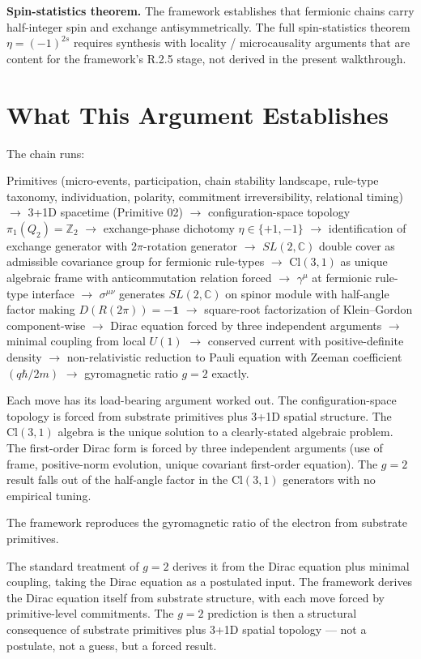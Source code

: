 \documentclass[11pt,a4paper]{article}
\begin{document}
\textbf{Spin-statistics theorem.} The framework establishes that fermionic chains carry half-integer spin and exchange antisymmetrically. The full spin-statistics theorem $\eta = (-1)^{2s}$ requires synthesis with locality / microcausality arguments that are content for the framework's R.2.5 stage, not derived in the present walkthrough.

\section{What This Argument Establishes}

The chain runs:

Primitives (micro-events, participation, chain stability landscape, rule-type taxonomy, individuation, polarity, commitment irreversibility, relational timing) $\to$ 3+1D spacetime (Primitive 02) $\to$ configuration-space topology $\pi_1(Q_2) = \mathbb{Z}_2$ $\to$ exchange-phase dichotomy $\eta \in \{+1, -1\}$ $\to$ identification of exchange generator with $2\pi$-rotation generator $\to$ $SL(2, \mathbb{C})$ double cover as admissible covariance group for fermionic rule-types $\to$ $\mathrm{Cl}(3,1)$ as unique algebraic frame with anticommutation relation forced $\to$ $\gamma^\mu$ at fermionic rule-type interface $\to$ $\sigma^{\mu\nu}$ generates $SL(2, \mathbb{C})$ on spinor module with half-angle factor making $D(R(2\pi)) = -\mathbf{1}$ $\to$ square-root factorization of Klein--Gordon component-wise $\to$ Dirac equation forced by three independent arguments $\to$ minimal coupling from local $U(1)$ $\to$ conserved current with positive-definite density $\to$ non-relativistic reduction to Pauli equation with Zeeman coefficient $(q\hbar/2m)$ $\to$ gyromagnetic ratio $g = 2$ exactly.

Each move has its load-bearing argument worked out. The configuration-space topology is forced from substrate primitives plus 3+1D spatial structure. The $\mathrm{Cl}(3,1)$ algebra is the unique solution to a clearly-stated algebraic problem. The first-order Dirac form is forced by three independent arguments (use of frame, positive-norm evolution, unique covariant first-order equation). The $g = 2$ result falls out of the half-angle factor in the $\mathrm{Cl}(3,1)$ generators with no empirical tuning.

The framework reproduces the gyromagnetic ratio of the electron from substrate primitives.

The standard treatment of $g = 2$ derives it from the Dirac equation plus minimal coupling, taking the Dirac equation as a postulated input. The framework derives the Dirac equation itself from substrate structure, with each move forced by primitive-level commitments. The $g = 2$ prediction is then a structural consequence of substrate primitives plus 3+1D spatial topology --- not a postulate, not a guess, but a forced result.
\end{document}
